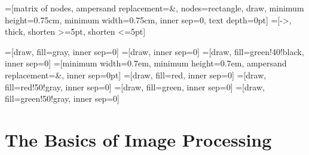 

=[matrix of nodes, ampersand replacement=\&, nodes={rectangle, draw, minimum
	height=0.75cm,
minimum width=0.75cm, inner sep=0, text depth=0pt}]
=[->, thick, shorten >=5pt, shorten <=5pt]

=[draw, fill=gray, inner sep=0]
=[draw, inner sep=0]
=[draw, fill=green!40!black, inner sep=0]
=[minimum width=0.7em, minimum height=0.7em, ampersand
		replacement=\&, inner sep=0pt]
=[draw, fill=red, inner sep=0]
=[draw, fill=red!50!gray, inner sep=0]
=[draw, fill=green, inner sep=0]
=[draw, fill=green!50!gray, inner sep=0]


\subtitle{Image Processing}

\newcommand{\abs}[1]{\ensuremath{\big\vert #1\big\vert}}



\subtitle{Image Processing}
\frame[plain,c]{\titlepage}

\section{The Basics of Image Processing}%

